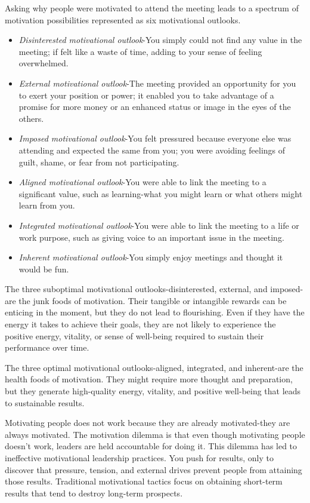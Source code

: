 \documentclass[ebook,12pt,oneside,openany]{memoir}
\begin{document}
Asking why people were motivated to attend the meeting leads to a spectrum of motivation possibilities represented as six motivational outlooks.
\begin{itemize}
    \item \textit{Disinterested motivational outlook}-You simply could not find any value in the meeting; if felt like a waste of time, adding to your sense of feeling overwhelmed.
    \item \textit{External motivational outlook}-The meeting provided an opportunity for you to exert your position or power; it enabled you to take advantage of a promise for more money or an enhanced status or image in the eyes of the others.
    \item \textit{Imposed motivational outlook}-You felt pressured because everyone else was attending and expected the same from you; you were avoiding feelings of guilt, shame, or fear from not participating.
    \item \textit{Aligned motivational outlook}-You were able to link the meeting to a significant value, such as learning-what you might learn or what others might learn from you.
    \item \textit{Integrated motivational outlook}-You were able to link the meeting to a life or work purpose, such as giving voice to an important issue in the meeting.
    \item \textit{Inherent motivational outlook}-You simply enjoy meetings and thought it would be fun.
\end{itemize}

The three suboptimal motivational outlooks-disinterested, external, and imposed-are the junk foods of motivation.
Their tangible or intangible rewards can be enticing in the moment, but they do not lead to flourishing.
Even if they have the energy it takes to achieve their goals, they are not likely to experience the positive energy, vitality, or sense of well-being required to sustain their performance over time.

The three optimal motivational outlooks-aligned, integrated, and inherent-are the health foods of motivation. They might require more thought and preparation, but they generate high-quality energy, vitality, and positive well-being that leads to sustainable results.

Motivating people does not work because they are already motivated-they are always motivated. The motivation dilemma is that even though motivating people doesn't work,
leaders are held accountable for doing it. This dilemma has led to ineffective motivational leadership practices. You push for results, only to discover that pressure, tension, and external drives prevent people from attaining those results.
Traditional motivational tactics focus on obtaining short-term results that tend to destroy long-term prospects.
\end{document}
